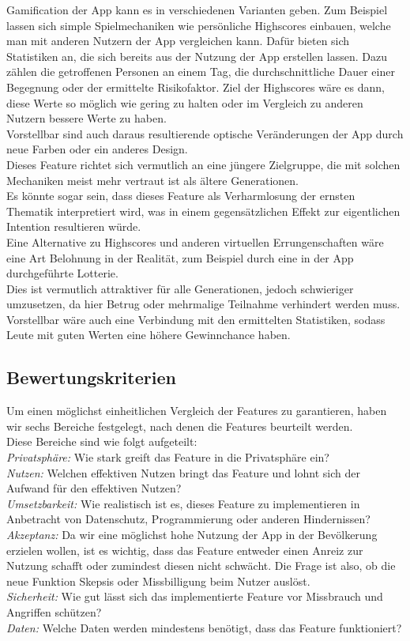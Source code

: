 \documentclass[conference]{IEEEtran}
\begin{document}
Gamification der App kann es in verschiedenen Varianten geben. Zum Beispiel lassen sich simple Spielmechaniken wie persönliche Highscores einbauen, welche man mit anderen Nutzern der App vergleichen kann.  Dafür bieten sich Statistiken an, die sich bereits aus der Nutzung der App erstellen lassen. Dazu zählen die getroffenen Personen an einem Tag, die durchschnittliche Dauer einer Begegnung oder der ermittelte Risikofaktor. Ziel der Highscores wäre es dann, diese Werte so möglich wie gering zu halten oder im Vergleich zu anderen Nutzern bessere Werte zu haben.\\
Vorstellbar sind auch daraus resultierende optische Veränderungen der App durch neue Farben oder ein anderes Design.\\
Dieses Feature richtet sich vermutlich an eine jüngere Zielgruppe, die mit solchen Mechaniken meist mehr vertraut ist als ältere Generationen.\\
Es könnte sogar sein, dass dieses Feature als Verharmlosung der ernsten Thematik interpretiert wird, was in einem gegensätzlichen Effekt zur eigentlichen Intention resultieren würde.\\
Eine Alternative zu Highscores und anderen virtuellen Errungenschaften wäre eine Art Belohnung in der Realität, zum Beispiel durch eine in der App durchgeführte Lotterie.\\
Dies ist vermutlich attraktiver für alle Generationen, jedoch schwieriger umzusetzen, da hier Betrug oder mehrmalige Teilnahme verhindert werden muss. Vorstellbar wäre auch eine Verbindung mit den ermittelten Statistiken, sodass Leute mit guten Werten eine höhere Gewinnchance haben.\\
 
\subsection{Bewertungskriterien}

Um einen möglichst einheitlichen Vergleich der Features zu garantieren, haben wir sechs Bereiche festgelegt, nach denen die Features beurteilt werden.\\
Diese Bereiche sind wie folgt aufgeteilt:\\
\textit{Privatsphäre:} Wie stark greift das Feature in die Privatsphäre ein?\\
\textit{Nutzen:} Welchen effektiven Nutzen bringt das Feature und lohnt sich der Aufwand für den effektiven Nutzen?\\
\textit{Umsetzbarkeit:} Wie realistisch ist es, dieses Feature zu implementieren in Anbetracht von Datenschutz, Programmierung oder anderen Hindernissen?\\
\textit{Akzeptanz:} Da wir eine möglichst hohe Nutzung der App in der Bevölkerung erzielen wollen, ist es wichtig, dass das Feature entweder einen Anreiz zur Nutzung schafft oder zumindest diesen nicht schwächt. Die Frage ist also, ob die neue Funktion Skepsis oder Missbilligung beim Nutzer auslöst.\\
\textit{Sicherheit:} Wie gut lässt sich das implementierte Feature vor Missbrauch und Angriffen schützen?\\
\textit{Daten:} Welche Daten werden mindestens benötigt, dass das Feature funktioniert?\\
\end{document}
